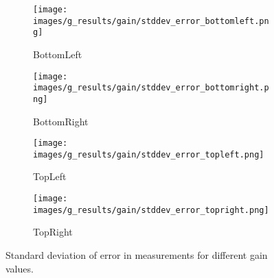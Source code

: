 \begin{figure}[ht]
    \centering
    \begin{subfigure}[b]{0.46\textwidth}
        \centering
        \texttt{[image: images/g\_results/gain/stddev\_error\_bottomleft.png]}
        \caption{\textsf{BottomLeft}}
    \end{subfigure}
    \hspace{1cm}
    \begin{subfigure}[b]{0.46\textwidth}
        \centering
        \texttt{[image: images/g\_results/gain/stddev\_error\_bottomright.png]}
        \caption{\textsf{BottomRight}}
    \end{subfigure}

    \vspace{5mm}
    
    \begin{subfigure}[b]{0.46\textwidth}
        \centering
        \texttt{[image: images/g\_results/gain/stddev\_error\_topleft.png]}
        \caption{\textsf{TopLeft}}
    \end{subfigure}
    \hspace{1cm}
    \begin{subfigure}[b]{0.46\textwidth}
        \centering
        \texttt{[image: images/g\_results/gain/stddev\_error\_topright.png]}
        \caption{\textsf{TopRight}}
    \end{subfigure}

    \caption{Standard deviation of error in measurements for different gain values.}
    \label{fig:stddev_error_gain}
\end{figure}



